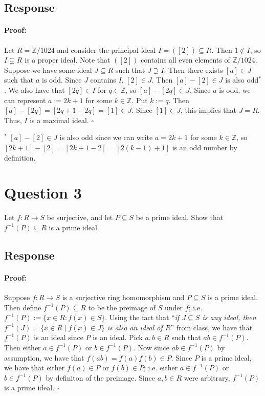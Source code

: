 \documentclass [12pt] {article}
\newcommand{\Z}{\mathbb{Z}}
\newenvironment{proof}{\paragraph{Proof:}}{\hfill$\square$}
\begin{document}
\subsection*{Response}
\begin{proof}
    Let $R = \Z/1024$ and consider the principal ideal $I = ([2]) \subseteq R$. Then $1 \not \in I$,
    so $I \subsetneq R$ is a proper ideal. Note that $([2])$ contains all even elements of
    $\Z/1024$. Suppose we have some ideal $J \subseteq R$ such that $J \supsetneq I$. Then there
    exists $[a] \in J$ such that $a$ is odd. Since $J$ contains $I$, $[2] \in J$. 
    Then $[a] - [2] \in J$ is also odd$^*$. We also have that $[2q] \in I$ for 
    $q \in \Z$, so $[a] - [2q] \in J$. Since $a$ is odd, we can represent $a := 2k + 1$ for some $k \in \Z$. 
    Put $k := q$. Then $[a] - [2q] = [2q + 1 - 2q] = [1] \in J$. Since 
    $[1] \in J$, this implies that $J = R$. Thus, $I$ is a maximal ideal.
\end{proof}
\vspace{2em}

$^*$ $[a] - [2] \in J$ is also odd since we can write $a = 2k + 1$ for some $k \in \Z$, so
$[2k + 1] - [2] = [2k + 1 - 2] = [2(k - 1) + 1]$ is an odd number by definition.

\newpage
\section*{Question 3}
\newcommand{\finv}{f^{-1}}
Let $f:R\to S$ be surjective, and let $P\subseteq S$ be a prime ideal. Show that $f^{-1}(P)\subseteq R$ is a prime ideal. 
\subsection*{Response}
\begin{proof}
    Suppose $f : R \to S$ is a surjective ring homomorphism and $P \subseteq S$ is a prime ideal. Then 
    define $\finv(P) \subseteq R$ to be the preimage of $S$ under $f$; i.e. $\finv(P) := \{ x \in R : f(x) \in S \}$.
    Using the fact that ``\textit{if $J \subseteq S$ is any ideal, then $\finv(J) = \{x \in R \mid f(x) \in J\}$
    is also an ideal of $R$}'' from class, we have that $\finv(P)$ is an ideal since $P$ is an ideal.
    Pick $a, b \in R$ such that $ab \in \finv(P)$. Then either $a \in \finv(P)$ or $b \in \finv(P)$. 
    Now since $ab \in \finv(P)$ by assumption, we have that $f(ab) = f(a)f(b)\in P$. 
    Since $P$ is a prime ideal, we have that either $f(a) \in P$ or $f(b) \in P$; i.e. either 
    $a \in \finv(P)$ or $b \in \finv(P)$ by definiton of the preimage. Since $a, b \in R$ were arbitrary,
    $\finv(P)$ is a prime ideal.
\end{proof}
\end{document}
